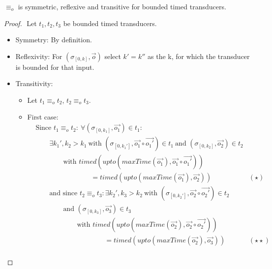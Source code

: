 \begin{lemma}[name=Observational Equivalence is an Equivalence Relationship for Bounded Transducers]\label{lemma:observational_equivalence_equivalence_relationship}
  \(\equiv_o\) is symmetric, reflexive and transitive for bounded timed transducers.
\end{lemma}
\begin{proof}$ $\newline
  Let \(t_1, t_2, t_3\) be bounded timed transducers.
  \begin{itemize}
    \item Symmetry: By definition.
    \item Reflexivity: For \((\sigma_{[0,k]}, \vec{o})\) select \(k' = k''\) as the k, for which the transducer is bounded for that input.
    \item Transitivity:
      \begin{itemize}
        \item Let \(t_1 \equiv_o t_2\), \(t_2 \equiv_o t_3\).
        \item First case:
          \begin{align*}
            &\text{Since } t_1 \equiv_o t_2:\ \forall (\sigma_{[0,k_1]}, \vec{o_1}) \in t_1: \\
            &\hspace{2em} \exists k_1', k_2 > k_1\ \text{with } (\sigma_{[0,k_1']}, \vec{o_1}\circ\vec{o_1'}) \in t_1\ \text{and } (\sigma_{[0,k_2]}, \vec{o_2}) \in t_2 \\
            &\hspace{4em} \text{with } \mathit{timed}(\mathit{upto}(\mathit{maxTime}(\vec{o_1}),\vec{o_1} \circ \vec{o_1'} )) \\
            &\hspace{8em} = \mathit{timed}(\mathit{upto}(\mathit{maxTime}(\vec{o_1}),\vec{o_2})) & (\star)\\
            &\hspace{2em} \text{and since } t_2 \equiv_o t_3: \exists k_2', k_3 > k_2\ \text{with } (\sigma_{[0,k_2']}, \vec{o_2}\circ\vec{o_2'}) \in t_2 \\
            &\hspace{4em} \text{and } (\sigma_{[0,k_3]}, \vec{o_3}) \in t_3 \\
            &\hspace{6em} \text{with } \mathit{timed}(\mathit{upto}(\mathit{maxTime}(\vec{o_2}),\vec{o_2} \circ \vec{o_2'} )) \\
            &\hspace{10em} = \mathit{timed}(\mathit{upto}(\mathit{maxTime}(\vec{o_2}),\vec{o_3})) & (\star\star)\\

\end{align*}
\end{itemize}
\end{itemize}
\end{proof}
